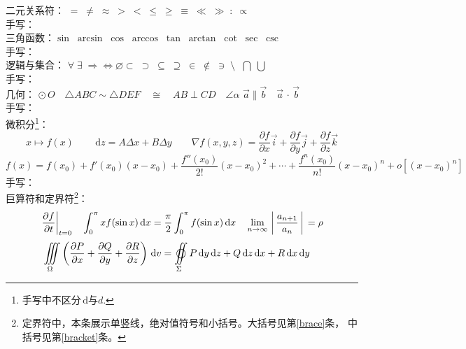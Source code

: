 \documentclass[11pt, a4paper]{article}
\newcommand\diff{\,\mathrm{d}}
\begin{document}
\begin{enumerate}
    二元关系符：{\fontsize{12pt}{1} $= \; \ne \; \approx \; > \; < \; \le \; \ge \; \equiv \; \ll \; \gg \; : \; \propto$}\\ 手写：\\[7pt]
    三角函数：$\sin \; \arcsin \; \cos \; \arccos \; \tan \; \arctan \; \cot \; \sec \; \csc$\\ 手写：\\[7pt]
    逻辑与集合：{\fontsize{12pt}{1} $\forall \; \exists \; \Rightarrow \iff \varnothing \subset \; \supset \; \subseteq \; \supseteq \; \in \; \notin \; \ni \; \setminus \;$} $\bigcap \; \bigcup$\\ 手写：\\[7pt] %
    几何：{\fontsize{10pt}{1} $\odot\,O \quad \triangle ABC\!\sim\!\triangle DEF \quad \cong \quad AB\!\perp CD\!\quad \angle\alpha$} \quad $\vec{a}\parallel\vec{b} \quad \vec{a}\,\cdot\,\vec{b}$ \\ 手写：\\[7pt]
    微积分\footnote{手写中不区分$\diff$与$d$.}：
    \begin{displaymath}
    x \mapsto f(x) \qquad \diff z = A\Delta x + B\Delta y \qquad
    \nabla f(x, y, z) = \frac{\partial f}{\partial x}\vec{i} + \frac{\partial f}{\partial y}\vec{j} + \frac{\partial f}{\partial z}\vec{k}
    \end{displaymath}
    \begin{displaymath}
    f(x) = f(x_{0}) + f'(x_{0})(x - x_{0}) + \frac{f''(x_{0})}{2!}(x - x_{0})^{2} + \cdots + \frac{f^{n}(x_{0})}{n!}(x - x_{0})^{n} + o[(x - x_{0})^{n}]
    \end{displaymath}
    手写：\\[60pt]
    巨算符和定界符\footnote{定界符中，本条展示单竖线，绝对值符号和小括号。大括号见第\ref{brace}条，
    中括号见第\ref{bracket}条。}：
    \begin{displaymath}
    \left. \frac{\partial f}{\partial t} \right|_{t=0} \quad
    \int_0^{\pi} x f(\sin x) \diff x = \frac{\pi}{2} \int_0^{\pi} f(\sin x) \diff x \quad
    \lim_{n \to \infty}\bigg\arrowvert \frac{a_{n+1}}{a_{n}} \bigg\arrowvert = \rho
    \end{displaymath}
    \begin{displaymath}
    \iiint\limits_\Omega \left(\frac{\partial P}{\partial x} + \frac{\partial Q}{\partial y} + \frac{\partial R}{\partial z} \right) \diff v = \varoiint\limits_\Sigma P\diff y \diff z + Q\diff z \diff x + R\diff x \diff y \quad %

\end{displaymath}
\end{enumerate}
\end{document}
